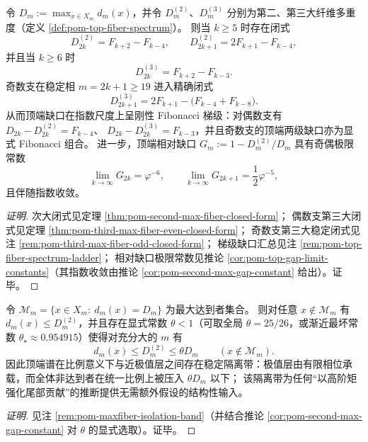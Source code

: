 \begin{conclusion}\label{con:xi-terminal-top-spectrum-fibonacci-ladder-gaps}
令 \(D_m:=\max_{x\in X_m}d_m(x)\)，并令 \(D_m^{(2)}\)、\(D_m^{(3)}\) 分别为第二、第三大纤维多重度（定义 \ref{def:pom-top-fiber-spectrum}）。
则当 \(k\ge 5\) 时存在闭式
\[
D_{2k}^{(2)}=F_{k+2}-F_{k-4},\qquad
D_{2k+1}^{(2)}=2F_{k+1}-F_{k-4},
\]
并且当 \(k\ge 6\) 时
\[
D_{2k}^{(3)}=F_{k+2}-F_{k-3}.
\]
奇数支在稳定相 \(m=2k+1\ge 19\) 进入精确闭式
\[
D_{2k+1}^{(3)}=2F_{k+1}-\bigl(F_{k-4}+F_{k-8}\bigr).
\]
从而顶端缺口在指数尺度上呈刚性 Fibonacci 梯级：对偶数支有
\(
D_{2k}-D_{2k}^{(2)}=F_{k-4}
\)、
\(
D_{2k}-D_{2k}^{(3)}=F_{k-3}
\)，并且奇数支的顶端两级缺口亦为显式 Fibonacci 组合。
进一步，顶端相对缺口
\(
G_m:=1-D_m^{(2)}/D_m
\)
具有奇偶极限常数
\[
\lim_{k\to\infty}G_{2k}=\varphi^{-6},\qquad
\lim_{k\to\infty}G_{2k+1}=\frac12\varphi^{-5},
\]
且伴随指数收敛。
\end{conclusion}
\begin{proof}[证明]
次大闭式见定理 \ref{thm:pom-second-max-fiber-closed-form}；
偶数支第三大闭式见定理 \ref{thm:pom-third-max-fiber-even-closed-form}；
奇数支第三大稳定闭式见注 \ref{rem:pom-third-max-fiber-odd-closed-form}；
梯级缺口汇总见注 \ref{rem:pom-top-fiber-spectrum-ladder}；
相对缺口极限常数见推论 \ref{cor:pom-top-gap-limit-constants}（其指数收敛由推论 \ref{cor:pom-second-max-gap-constant} 给出）。证毕。
\end{proof}

\begin{conclusion}\label{con:xi-terminal-top-spectrum-isolation-band}
令
\(
\mathcal{M}_m=\{x\in X_m:\ d_m(x)=D_m\}
\)
为最大达到者集合。
则对任意 \(x\notin\mathcal{M}_m\) 有 \(d_m(x)\le D_m^{(2)}\)，并且存在显式常数 \(\theta<1\)（可取全局 \(\theta=25/26\)，或渐近最坏常数 \(\theta_\star\approx 0.954915\)）使得对充分大的 \(m\) 有
\[
d_m(x)\le D_m^{(2)}\le \theta D_m\qquad(x\notin\mathcal{M}_m).
\]
因此顶端谱在比例意义下与近极值层之间存在稳定隔离带：极值层由有限相位承载，而全体非达到者在统一比例上被压入 \(\theta D_m\) 以下；
该隔离带为任何“以高阶矩强化尾部贡献”的推断提供无需额外假设的结构性输入。
\end{conclusion}
\begin{proof}[证明]
见注 \ref{rem:pom-maxfiber-isolation-band}（并结合推论 \ref{cor:pom-second-max-gap-constant} 对 \(\theta\) 的显式选取）。证毕。
\end{proof}

